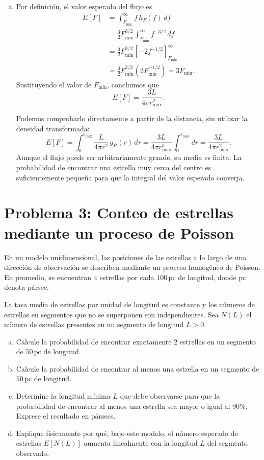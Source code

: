 \documentclass[a4paper]{article}
\begin{document}
\begin{enumerate}[a)]
\item Por definición, el valor esperado del flujo es
\begin{align*}
E[F]
&=\int_{F_{\min}}^\infty f\,h_F(f)\,df\\
&=\frac{3}{2}F_{\min}^{3/2}\int_{F_{\min}}^\infty f^{-3/2}\,df\\
&=\frac{3}{2}F_{\min}^{3/2}
  \left[-2f^{-1/2}\right]_{F_{\min}}^\infty\\
&=\frac{3}{2}F_{\min}^{3/2}\left(2F_{\min}^{-1/2}\right)
=3F_{\min}.
\end{align*}
Sustituyendo el valor de $F_{\min}$, concluimos que
$$
\boxed{E[F]=\frac{3L}{4\pi r_{\max}^2}.}
$$

Podemos comprobarlo directamente a partir de la distancia, sin utilizar la densidad transformada:
$$
E[F]
=\int_0^{r_{\max}}\frac{L}{4\pi r^2}\,g_R(r)\,dr
=\frac{3L}{4\pi r_{\max}^3}\int_0^{r_{\max}}dr
=\frac{3L}{4\pi r_{\max}^2}.
$$
Aunque el flujo puede ser arbitrariamente grande, su media es finita. La probabilidad de encontrar una estrella muy cerca del centro es suficientemente pequeña para que la integral del valor esperado converja.


\end{enumerate}

\section{Problema 3: Conteo de estrellas mediante un proceso de Poisson}

En un modelo unidimensional, las posiciones de las estrellas a lo largo de una dirección de observación se describen mediante un proceso homogéneo de Poisson. En promedio, se encuentran $4$ estrellas por cada $100\,\mathrm{pc}$ de longitud, donde $\mathrm{pc}$ denota pársec.

La tasa media de estrellas por unidad de longitud es constante y los números de estrellas en segmentos que no se superponen son independientes. Sea $N(L)$ el número de estrellas presentes en un segmento de longitud $L>0$.

\begin{enumerate}[a)]
    \item Calcule la probabilidad de encontrar exactamente $2$ estrellas en un segmento de $50\,\mathrm{pc}$ de longitud.
    \item Calcule la probabilidad de encontrar al menos una estrella en un segmento de $50\,\mathrm{pc}$ de longitud.
    \item Determine la longitud mínima $L$ que debe observarse para que la probabilidad de encontrar al menos una estrella sea mayor o igual al $90\%$. Exprese el resultado en pársecs.
    \item Explique físicamente por qué, bajo este modelo, el número esperado de estrellas $E[N(L)]$ aumenta linealmente con la longitud $L$ del segmento observado.
\end{enumerate}
\end{document}
